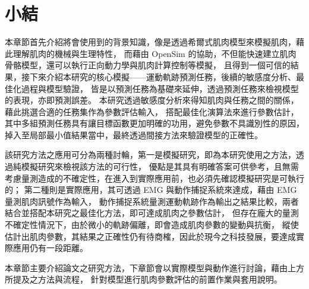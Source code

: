 \section{小結}
本章節首先介紹將會使用到的背景知識，像是透過希爾式肌肉模型來模擬肌肉，藉此理解肌肉的機械與生理特性，
而藉由 OpenSim 的協助，不但能快速建立肌肉骨骼模型，還可以執行正向動力學與肌肉計算控制等模擬，
且得到一個可信的結果，接下來介紹本研究的核心模擬——運動軌跡預測任務，後續的敏感度分析、最佳化過程與模型驗證，
皆是以預測任務為基礎來延伸，透過預測任務來檢視模型的表現，亦即預測誤差。
本研究透過敏感度分析來得知肌肉與任務之間的關係，藉此挑選合適的任務集作為參數評估輸入，
搭配最佳化演算法來進行參數估計，其中多組預測任務具有讓目標函數更加明確的功用，避免參數不具識別性的原因，
掉入至局部最小值結果當中，最終透過間接方法來驗證模型的正確性。

該研究方法之應用可分為兩種討輪，第一是模擬研究，即為本研究使用之方法，透過純模擬研究來檢視該方法的可行性，
優點是其具有明確答案可供參考，且無需考慮量測造成的不確定性，在進入到實際應用前，也必須先確認模擬研究是可執行的；
第二種則是實際應用，其可透過 EMG 與動作捕捉系統來達成，藉由 EMG 量測肌肉訊號作為輸入，
動作捕捉系統量測運動軌跡作為輸出之結果比較，兩者結合並搭配本研究之最佳化方法，即可達成肌肉之參數估計，
但存在龐大的量測不確定性情況下，由於微小的軌跡偏離，即會造成肌肉參數的變動與抗衡，
縱使估計出肌肉參數，其結果之正確性仍有待商榷，因此於現今之科技發展，要達成實際應用仍有一段距離。

本章節主要介紹論文之研究方法，下章節會以實際模型與動作進行討論，藉由上方所提及之方法與流程，
針對模型進行肌肉參數評估的前置作業與套用說明。

\clearpage